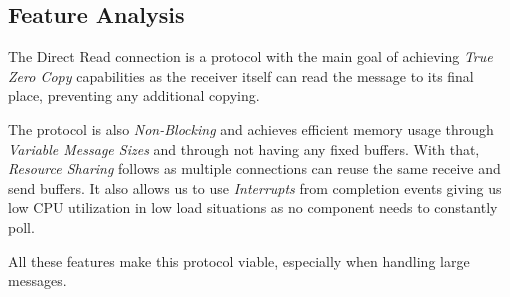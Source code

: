 \subsection{Feature Analysis}

The Direct Read connection is a protocol with the main goal of achieving  \emph{True Zero Copy} capabilities as 
the receiver itself can read the message to its final place, preventing any additional 
copying. 

The protocol is also \emph{Non-Blocking} and achieves efficient memory usage through \emph{Variable Message Sizes} and through 
not 
having any fixed buffers. With that, \emph{Resource Sharing} follows as multiple connections can reuse the same receive and 
send buffers. It also allows us to use \emph{Interrupts} from completion events
giving us low CPU utilization in low load situations as no component needs to constantly poll.

All these features make this protocol viable, especially when handling large messages.
